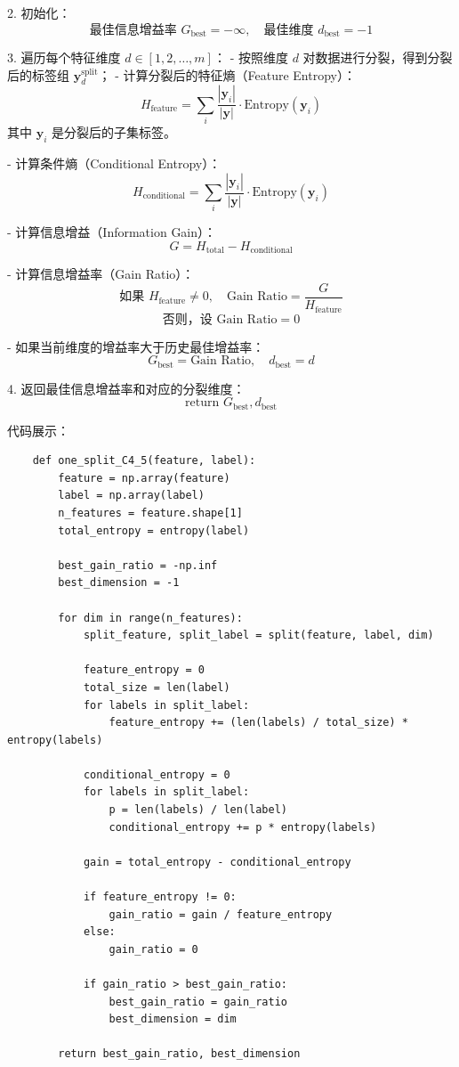 \documentclass[12pt,a4paper,oneside]{article}
\begin{document}
2. 初始化：
   \[
   \text{最佳信息增益率 } G_{\text{best}} = -\infty, \quad \text{最佳维度 } d_{\text{best}} = -1
   \]

3. 遍历每个特征维度 $d \in [1, 2, \ldots, m]$：
   - 按照维度 $d$ 对数据进行分裂，得到分裂后的标签组 $\mathbf{y}_d^{\text{split}}$；
   - 计算分裂后的特征熵（Feature Entropy）：
     \[
     H_{\text{feature}} = \sum_{i} \frac{|\mathbf{y}_i|}{|\mathbf{y}|} \cdot \text{Entropy}(\mathbf{y}_i)
     \]
     其中 $\mathbf{y}_i$ 是分裂后的子集标签。

   - 计算条件熵（Conditional Entropy）：
     \[
     H_{\text{conditional}} = \sum_{i} \frac{|\mathbf{y}_i|}{|\mathbf{y}|} \cdot \text{Entropy}(\mathbf{y}_i)
     \]

   - 计算信息增益（Information Gain）：
     \[
     G = H_{\text{total}} - H_{\text{conditional}}
     \]

   - 计算信息增益率（Gain Ratio）：
     \[
     \text{如果 } H_{\text{feature}} \neq 0, \quad \text{Gain Ratio} = \frac{G}{H_{\text{feature}}}
     \]
     \[
     \text{否则，设 } \text{Gain Ratio} = 0
     \]

   - 如果当前维度的增益率大于历史最佳增益率：
     \[
     G_{\text{best}} = \text{Gain Ratio}, \quad d_{\text{best}} = d
     \]

4. 返回最佳信息增益率和对应的分裂维度：
   \[
   \text{return } G_{\text{best}}, d_{\text{best}}
   \]

代码展示：
\begin{lstlisting}  
    def one_split_C4_5(feature, label):
        feature = np.array(feature)
        label = np.array(label)
        n_features = feature.shape[1]
        total_entropy = entropy(label)
        
        best_gain_ratio = -np.inf
        best_dimension = -1
    
        for dim in range(n_features):
            split_feature, split_label = split(feature, label, dim)
            
            feature_entropy = 0
            total_size = len(label)
            for labels in split_label:
                feature_entropy += (len(labels) / total_size) * entropy(labels)
            
            conditional_entropy = 0
            for labels in split_label:
                p = len(labels) / len(label)
                conditional_entropy += p * entropy(labels)
            
            gain = total_entropy - conditional_entropy
            
            if feature_entropy != 0:
                gain_ratio = gain / feature_entropy
            else:
                gain_ratio = 0
            
            if gain_ratio > best_gain_ratio:
                best_gain_ratio = gain_ratio
                best_dimension = dim
    
        return best_gain_ratio, best_dimension
    
\end{lstlisting}
\end{document}
